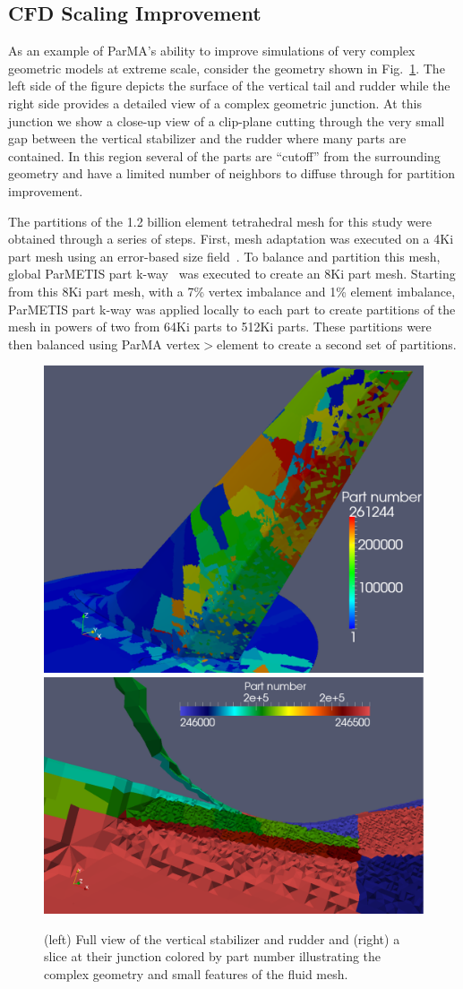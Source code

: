 \subsection{CFD Scaling Improvement}

As an example of ParMA's ability to improve simulations of very complex
geometric models at extreme scale, consider the geometry shown in
Fig.~\ref{fig:BoeingGeom}.
The left side of the figure depicts the surface of the vertical
tail and rudder while the right side provides a detailed
view of a complex geometric junction.
At this junction we show a close-up view of a clip-plane cutting through the very
small gap between the vertical stabilizer and the rudder where many parts are
contained.
In this region several of the parts are ``cutoff'' from the surrounding geometry
and have a limited number of neighbors to diffuse through for partition improvement.

The partitions of the 1.2 billion element tetrahedral mesh for this study were
obtained through a series of steps.
First, mesh adaptation was executed on a 4Ki part mesh using an error-based size
field~\cite{chitale2014anisotropic,Sahn06}.
To balance and partition this mesh, global ParMETIS part
k-way~\cite{karypis1998multilevel} was executed to create an 8Ki part mesh.
Starting from this 8Ki part mesh, with a 7\% vertex imbalance and 1\% element
imbalance, ParMETIS part k-way was applied locally to each part to
create partitions of the mesh in powers of two from 64Ki parts to 512Ki parts.  
These partitions were then balanced using ParMA vertex$>$element to
create a second set of partitions.

\begin{figure} \centering
  \includegraphics[width=.45\textwidth]{results/phasta/stabilizerFullView.eps}
  \includegraphics[width=.54\textwidth]{results/phasta/stabilizerGap.eps}
  \caption{
    (left) Full view of the vertical stabilizer and rudder and (right) a slice
    at their junction colored by part number illustrating the complex geometry
    and small features of the fluid mesh.
  }
  \label{fig:BoeingGeom}
\end{figure}

